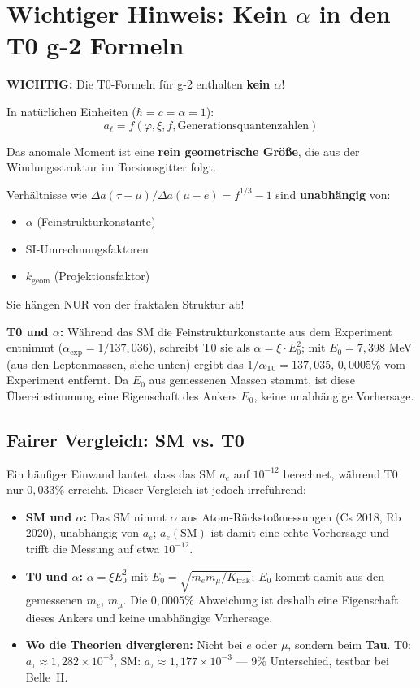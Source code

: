 	\section{Wichtiger Hinweis: Kein $\alpha$ in den T0 g-2 Formeln}
	
	\textbf{WICHTIG:}
	Die T0-Formeln für g-2 enthalten \textbf{kein $\alpha$}!
	
	In natürlichen Einheiten ($\hbar = c = \alpha = 1$):
	\[ a_\ell = f(\varphi, \xi, f, \text{Generationsquantenzahlen}) \]
	
	Das anomale Moment ist eine \textbf{rein geometrische Größe},
	die aus der Windungsstruktur im Torsionsgitter folgt.
	
	Verhältnisse wie $\Delta a(\tau-\mu)/\Delta a(\mu-e) = f^{1/3} - 1$ sind
	\textbf{unabhängig} von:
	\begin{itemize}
		\item $\alpha$ (Feinstrukturkonstante)
		\item SI-Umrechnungsfaktoren
		\item $k_{\text{geom}}$ (Projektionsfaktor)
	\end{itemize}
	
	Sie hängen NUR von der fraktalen Struktur ab!
	
	\textbf{T0 und $\alpha$:} Während das SM die Feinstrukturkonstante aus dem Experiment entnimmt ($\alpha_\text{exp} = 1/137{,}036$), schreibt T0 sie als $\alpha = \xi \cdot E_0^2$; mit $E_0 = 7{,}398$ MeV (aus den Leptonmassen, siehe unten) ergibt das $1/\alpha_\text{T0} = 137{,}035$, $0{,}0005\%$ vom Experiment entfernt. Da $E_0$ aus gemessenen Massen stammt, ist diese Übereinstimmung eine Eigenschaft des Ankers $E_0$, keine unabhängige Vorhersage.
	
	\subsection{Fairer Vergleich: SM vs. T0}
	
	Ein häufiger Einwand lautet, dass das SM $a_e$ auf $10^{-12}$ berechnet, während T0 nur $0{,}033\%$ erreicht. Dieser Vergleich ist jedoch irreführend:
	
	\begin{itemize}
		\item \textbf{SM und $\alpha$:} Das SM nimmt $\alpha$ aus Atom-Rückstoßmessungen (Cs 2018, Rb 2020), unabhängig von $a_e$; $a_e(\text{SM})$ ist damit eine echte Vorhersage und trifft die Messung auf etwa $10^{-12}$.
		\item \textbf{T0 und $\alpha$:} $\alpha = \xi E_0^2$ mit $E_0 = \sqrt{m_e m_\mu/K_\text{frak}}$; $E_0$ kommt damit aus den gemessenen $m_e$, $m_\mu$. Die $0{,}0005\%$ Abweichung ist deshalb eine Eigenschaft dieses Ankers und keine unabhängige Vorhersage.
		\item \textbf{Wo die Theorien divergieren:} Nicht bei $e$ oder $\mu$, sondern beim \textbf{Tau}. T0: $a_\tau \approx 1{,}282 \times 10^{-3}$, SM: $a_\tau \approx 1{,}177 \times 10^{-3}$ — $9\%$ Unterschied, testbar bei Belle~II.
	\end{itemize}

